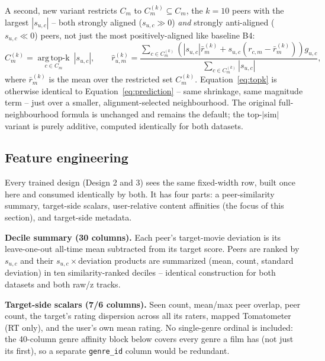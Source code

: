 \documentclass[11pt]{article}
\begin{document}
A second, new variant restricts $C_m$ to $C_m^{(k)}\subseteq C_m$, the $k=10$ peers with the largest $|s_{u,c}|$ -- both strongly aligned ($s_{u,c}\gg0$) \emph{and} strongly anti-aligned ($s_{u,c}\ll0$) peers, not just the most positively-aligned like baseline B4:
\begin{equation}
C_m^{(k)}=\operatorname*{arg\,top\text{-}k}_{c\in C_m}\ |s_{u,c}|,
\qquad
\hat r_{u,m}^{(k)}=\frac{\sum_{c\in C_m^{(k)}}\left(|s_{u,c}|\bar r_m^{(k)}+s_{u,c}(r_{c,m}-\bar r_m^{(k)})\right)g_{u,c}}{\sum_{c\in C_m^{(k)}}|s_{u,c}|},
\label{eq:topk}
\end{equation}
where $\bar r_m^{(k)}$ is the mean over the restricted set $C_m^{(k)}$. Equation~\ref{eq:topk} is otherwise identical to Equation~\ref{eq:prediction} -- same shrinkage, same magnitude term -- just over a smaller, alignment-selected neighbourhood. The original full-neighbourhood formula is unchanged and remains the default; the top-$|$sim$|$ variant is purely additive, computed identically for both datasets.

\subsection{Feature engineering}
\label{sec:features-eq}

Every trained design (Design 2 and 3) sees the same fixed-width row, built once here and consumed identically by both. It has four parts: a peer-similarity summary, target-side scalars, user-relative content affinities (the focus of this section), and target-side metadata.

\textbf{Decile summary (30 columns).} Each peer's target-movie deviation is its leave-one-out all-time mean subtracted from its target score. Peers are ranked by $s_{u,c}$ and their $s_{u,c}\times\text{deviation}$ products are summarized (mean, count, standard deviation) in ten similarity-ranked deciles -- identical construction for both datasets and both raw/z tracks.

\textbf{Target-side scalars (7/6 columns).} Seen count, mean/max peer overlap, peer count, the target's rating dispersion across all its raters, mapped Tomatometer (RT only), and the user's own mean rating. No single-genre ordinal is included: the 40-column genre affinity block below covers every genre a film has (not just its first), so a separate \texttt{genre\_id} column would be redundant.
\end{document}
